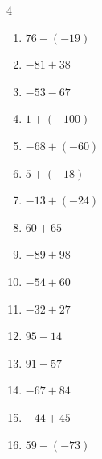 \begin{multicols}{4}
\begin{enumerate}
        \phantom{$=63$}

  \item $76-(-19)$

        \phantom{$=95$}

  \item $-81+38$

        \phantom{$=-43$}

  \item $-53-67$

        \phantom{$=-120$}

  \item $1+(-100)$

        \phantom{$=-99$}

  \item $-68+(-60)$

        \phantom{$=-128$}

  \item $5+(-18)$

        \phantom{$=-13$}

  \item $-13+(-24)$

        \phantom{$=-37$}

  \item $60+65$

        \phantom{$=125$}

  \item $-89+98$

        \phantom{$=9$}

  \item $-54+60$

        \phantom{$=6$}

  \item $-32+27$

        \phantom{$=-5$}

  \item $95-14$

        \phantom{$=81$}

  \item $91-57$

        \phantom{$=34$}

  \item $-67+84$

        \phantom{$=17$}

  \item $-44+45$

        \phantom{$=1$}

\columnbreak %

  \item $59-(-73)$


\end{enumerate}
\end{multicols}
